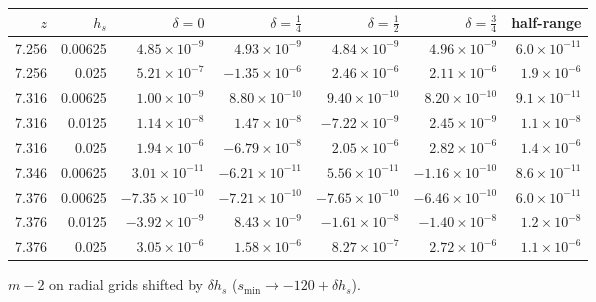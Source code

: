 \begin{tabular}{rrrrrrr}
\toprule
$z$ & $h_s$ & $\delta=0$ & $\delta=\tfrac14$ & $\delta=\tfrac12$ & $\delta=\tfrac34$ & half-range\\
\midrule
7.256 & 0.00625 & $4.85\times10^{-9}$ & $4.93\times10^{-9}$ & $4.84\times10^{-9}$ & $4.96\times10^{-9}$ & $6.0\times10^{-11}$\\
7.256 & 0.025 & $5.21\times10^{-7}$ & $-1.35\times10^{-6}$ & $2.46\times10^{-6}$ & $2.11\times10^{-6}$ & $1.9\times10^{-6}$\\
7.316 & 0.00625 & $1.00\times10^{-9}$ & $8.80\times10^{-10}$ & $9.40\times10^{-10}$ & $8.20\times10^{-10}$ & $9.1\times10^{-11}$\\
7.316 & 0.0125 & $1.14\times10^{-8}$ & $1.47\times10^{-8}$ & $-7.22\times10^{-9}$ & $2.45\times10^{-9}$ & $1.1\times10^{-8}$\\
7.316 & 0.025 & $1.94\times10^{-6}$ & $-6.79\times10^{-8}$ & $2.05\times10^{-6}$ & $2.82\times10^{-6}$ & $1.4\times10^{-6}$\\
7.346 & 0.00625 & $3.01\times10^{-11}$ & $-6.21\times10^{-11}$ & $5.56\times10^{-11}$ & $-1.16\times10^{-10}$ & $8.6\times10^{-11}$\\
7.376 & 0.00625 & $-7.35\times10^{-10}$ & $-7.21\times10^{-10}$ & $-7.65\times10^{-10}$ & $-6.46\times10^{-10}$ & $6.0\times10^{-11}$\\
7.376 & 0.0125 & $-3.92\times10^{-9}$ & $8.43\times10^{-9}$ & $-1.61\times10^{-8}$ & $-1.40\times10^{-8}$ & $1.2\times10^{-8}$\\
7.376 & 0.025 & $3.05\times10^{-6}$ & $1.58\times10^{-6}$ & $8.27\times10^{-7}$ & $2.72\times10^{-6}$ & $1.1\times10^{-6}$\\
\bottomrule
\end{tabular}

\smallskip\par\footnotesize $m-2$ on radial grids shifted by $\delta h_s$ ($s_{\min}\to-120+\delta h_s$).
